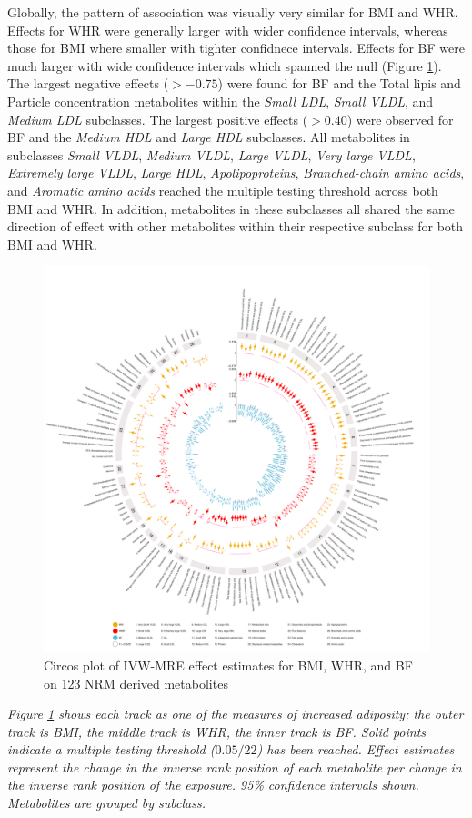 \documentclass[11pt,twoside]{bristolthesis}
\newcommand{\bsmall}{\begin{small}}
\newcommand{\esmall}{\end{small}}
\begin{document}
Globally, the pattern of association was visually very similar for BMI and WHR. Effects for WHR were generally larger with wider confidence intervals, whereas those for BMI where smaller with tighter confidnece intervals. Effects for BF were much larger with wide confidence intervals which spanned the null (Figure \ref{fig:chapter5-figure-circosplot-main-analysis}). The largest negative effects (\(> -0.75\)) were found for BF and the Total lipis and Particle concentration metabolites within the \emph{Small LDL}, \emph{Small VLDL}, and \emph{Medium LDL} subclasses. The largest positive effects (\(> 0.40\)) were observed for BF and the \emph{Medium HDL} and \emph{Large HDL} subclasses. All metabolites in subclasses \emph{Small VLDL}, \emph{Medium VLDL}, \emph{Large VLDL}, \emph{Very large VLDL}, \emph{Extremely large VLDL}, \emph{Large HDL}, \emph{Apolipoproteins}, \emph{Branched-chain amino acids}, and \emph{Aromatic amino acids} reached the multiple testing threshold across both BMI and WHR. In addition, metabolites in these subclasses all shared the same direction of effect with other metabolites within their respective subclass for both BMI and WHR.
\begin{figure}
\includegraphics[width=1\linewidth]{data/chapter5/figures/circosplot_main_analysis} \caption{Circos plot of IVW-MRE effect estimates for BMI, WHR, and BF on 123 NRM derived metabolites}\label{fig:chapter5-figure-circosplot-main-analysis}
\end{figure}
\noindent 
\bsmall
\emph{Figure \ref{fig:chapter5-figure-circosplot-main-analysis} shows each track as one of the measures of increased adiposity; the outer track is BMI, the middle track is WHR, the inner track is BF. Solid points indicate a multiple testing threshold (\(0.05/22\)) has been reached. Effect estimates represent the change in the inverse rank position of each metabolite per change in the inverse rank position of the exposure. 95\% confidence intervals shown. Metabolites are grouped by subclass.}
\esmall
\end{document}

